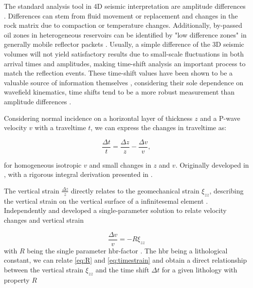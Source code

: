 The standard analysis tool in 4D seismic interpretation are amplitude differences \citep{Johnston2013-jg}. Differences can stem from fluid movement or replacement and changes in the rock matrix due to compaction or temperature changes. Additionally, by-passed oil zones in heterogeneous reservoirs can be identified by "low difference zones" in generally mobile reflector packets \citep{Yilmaz2003-hp}. Usually, a simple difference of the 3D seismic volumes will not yield satisfactory results due to small-scale fluctuations in both arrival times and amplitudes, making time-shift analysis an important process to match the reflection events. These time-shift values have been shown to be a valuable source of information themselves \citep{Hall2002-dt,Hatchell2005-eg}, considering their sole dependence on wavefield kinematics, time shifts tend to be a more robust measurement than amplitude differences \citep{Johnston2013-jg}.

Considering normal incidence on a horizontal layer of thickness $z$ and a P-wave velocity $v$ with a traveltime $t$, we can express the changes in traveltime as:

\begin{equation}
    \frac{\Delta t}{t} = \frac{\Delta z}{z} - \frac{\Delta v}{v},
    \label{eq:timestrain}
\end{equation}

for homogeneous isotropic $v$ and small changes in $z$ and $v$. Originally developed in \citet{Hatchell2005-eg}, with a rigorous integral derivation presented in \citet{macbeth2019post}.

The vertical strain $\frac{\Delta z}{z}$ directly relates to the geomechanical strain $\xi_{zz}$, describing the vertical strain on the vertical surface of a infinitesemal element \citep{Herwanger2015-qz}. Independently \citet{Hatchell2005-eg} and \citet{roste2006estimation} developed a single-parameter solution to relate velocity changes and vertical strain

\begin{equation}
    \frac{\Delta v}{v} = - R \xi_{zz}
    \label{eq:R}
\end{equation}
with $R$ being the single parameter \ac{hbr}-factor \citep{Hatchell2005-op, macbeth2019post}. The \ac{hbr} being a lithological constant, we can relate \cref{eq:R} and \cref{eq:timestrain} and obtain a direct relationship between the vertical strain $\xi_{zz}$ and the time shift $\Delta t$ for a given lithology with property $R$

